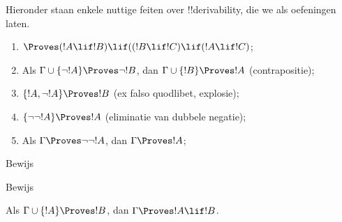 \documentclass[openany]{memoir}
\begin{document}
Hieronder staan enkele nuttige feiten over !!{derivability}, die we als
oefeningen laten.

\begin{prop}
\begin{enumerate}
\item $\Proves (!A \lif !B) \lif ((!B \lif !C)
  \lif (!A \lif !C)$; 
\item Als $\Gamma \cup \{ \lnot !A\}
  \Proves \lnot !B$, dan $\Gamma \cup \{ !B\} \Proves
  !A$ (contrapositie); 
\item  $\{ !A, \lnot!A\} \Proves
    !B$ (ex falso quodlibet, explosie); 
\item  $\{ \lnot\lnot!A\} \Proves
  !A$ (eliminatie van dubbele negatie);
\item Als $\Gamma \Proves \lnot\lnot!A$, dan $\Gamma \Proves
  !A$;
\end{enumerate}
\end{prop}

\begin{prob}
  Bewijs 
\end{prob}
\tagendprob

\begin{prob}
  Bewijs 
\end{prob}
\tagendprob
\endgroup

\begingroup
\def\olfilename{OLP-0120}
\def\olfilepath{content/first-order-logic/axiomatic-deduction/}
\hypertarget{unit-OLP-0120}{}





\begin{thm}[Deductiestelling]
 Als $\Gamma \cup \{!A\} \Proves !B$,
dan $\Gamma \Proves !A \lif !B$.
\end{thm}
\end{document}
